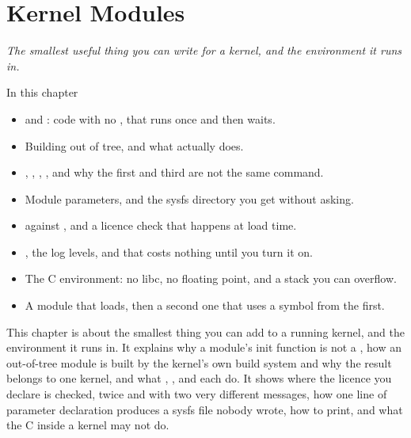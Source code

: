 
\chapter{Kernel Modules}
\label{c4:ch}

{\large\itshape The smallest useful thing you can write for a kernel, and the environment it runs
in.\par}

\begin{chapterbox}{In this chapter}
\begin{itemize}
  \item {} and : code with no , that runs once and then
    waits.
  \item Building out of tree, and what  actually does.
  \item {}, , , , and why the first and third are
    not the same command.
  \item Module parameters, and the sysfs directory you get without asking.
  \item {} against , and a licence check that happens at
    load time.
  \item {}, the log levels, and  that costs nothing until you turn it on.
  \item The C environment: no libc, no floating point, and a stack you can overflow.
  \item A module that loads, then a second one that uses a symbol from the first.
\end{itemize}
\end{chapterbox}

This chapter is about the smallest thing you can add to a running kernel, and the environment it
runs in. It explains why a module's init function is not a , how an out-of-tree module is
built by the kernel's own build system and why the result belongs to one kernel, and what
, ,  and  each do. It shows where the licence
you declare is checked, twice and with two very different messages, how one line of parameter
declaration produces a sysfs file nobody wrote, how to print, and what the C inside a kernel may
not do.

